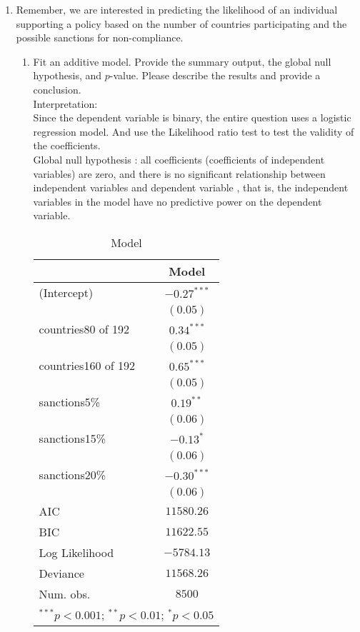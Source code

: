 \documentclass[12pt,letterpaper]{article}
\begin{document}
\begin{enumerate}
	\item
	Remember, we are interested in predicting the likelihood of an individual supporting a policy based on the number of countries participating and the possible sanctions for non-compliance.
	\begin{enumerate}
		\item [] Fit an additive model. Provide the summary output, the global null hypothesis, and $p$-value. Please describe the results and provide a conclusion.\\
		\vspace{.5cm}
		\noindent 
		Interpretation: \\
		Since the dependent variable is binary, the entire question uses a logistic regression model. And use the Likelihood ratio test to test the validity of the coefficients. \\
		Global null hypothesis : all coefficients (coefficients of independent variables) are zero, and there is no significant relationship between independent variables and dependent variable , that is, the independent variables in the model have no predictive power on the dependent variable.
		\begin{table}[h]\begin{center}\begin{tabular}{l c}\hline & Model \\\hline(Intercept)         & $-0.27^{***}$ \\                    & $(0.05)$      \\countries80 of 192  & $0.34^{***}$  \\                    & $(0.05)$      \\countries160 of 192 & $0.65^{***}$  \\                    & $(0.05)$      \\sanctions5\%        & $0.19^{**}$   \\                    & $(0.06)$      \\sanctions15\%       & $-0.13^{*}$   \\                    & $(0.06)$      \\sanctions20\%       & $-0.30^{***}$ \\                    & $(0.06)$      \\\hline AIC                 & $11580.26$    \\BIC                 & $11622.55$    \\Log Likelihood      & $-5784.13$    \\Deviance            & $11568.26$    \\Num. obs.           & $8500$        \\\hline\multicolumn{2}{l}{\scriptsize{$^{***}p<0.001$; $^{**}p<0.01$; $^{*}p<0.05$}}\end{tabular}\caption{Model}\label{table:coefficients}\end{center}\end{table}

\end{enumerate}
\end{enumerate}
\end{document}
